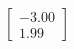 \documentclass[preview]{standalone}
\begin{document}
\begin{align*}
\begin{bmatrix} -3.00 \\ 1.99 \end{bmatrix}
\end{align*}
\end{document}
